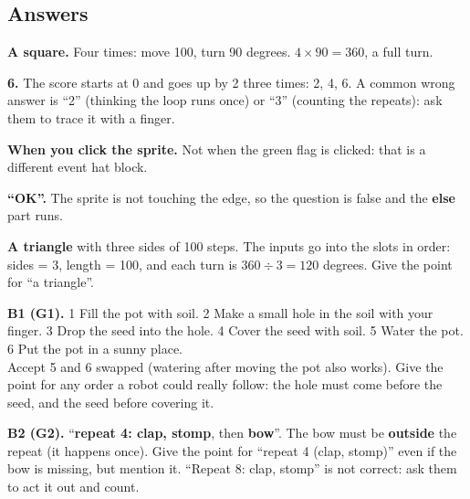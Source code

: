 \subsection{Answers}
\begin{answer}
\begin{description}[leftmargin=0pt,itemsep=3pt,font=\bfseries]
  \item[A1 (G2).] \textbf{A square.} Four times: move 100, turn 90 degrees. $4 \times 90 = 360$, a full turn.
  \item[A2 (G4).] \textbf{6.} The score starts at 0 and goes up by 2 three times: 2, 4, 6.
        A common wrong answer is \enquote{2} (thinking the loop runs once) or \enquote{3} (counting the repeats): ask them to trace it with a finger.
  \item[A3 (G3).] \textbf{When you click the sprite.} Not when the green flag is clicked: that is a different event hat block.
  \item[A4 (G3).] \textbf{\enquote{OK}.} The sprite is not touching the edge, so the question is false and the \textbf{else} part runs.
  \item[A5 (G5, G2).] \textbf{A triangle} with three sides of 100 steps. The inputs go into the slots in order:
        sides = 3, length = 100, and each turn is $360 \div 3 = 120$ degrees. Give the point for \enquote{a triangle}.
\end{description}
\end{answer}

\begin{answer}
\textbf{B1 (G1).} 1 Fill the pot with soil. 2 Make a small hole in the soil with your finger.
3 Drop the seed into the hole. 4 Cover the seed with soil. 5 Water the pot. 6 Put the pot in a sunny place.\\
Accept 5 and 6 swapped (watering after moving the pot also works). Give the point for any order a robot could really follow:
the hole must come before the seed, and the seed before covering it.

\textbf{B2 (G2).} \enquote{\textbf{repeat 4: clap, stomp}, then \textbf{bow}}. The bow must be \textbf{outside} the repeat
(it happens once). Give the point for \enquote{repeat 4 (clap, stomp)} even if the bow is missing, but mention it.
\enquote{Repeat 8: clap, stomp} is not correct: ask them to act it out and count.
\end{answer}

